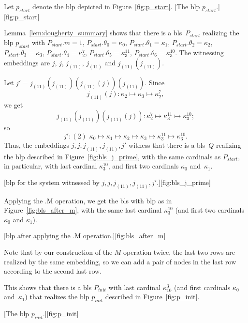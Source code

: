 \documentclass{article}
\theoremstyle{definition}
\theoremstyle{remark}
\begin{document}
Let $p_{start}$ denote the blp depicted in Figure~\ref{fig:p_start}. 
    [The blp $p_{start}$.][fig:p_start]

Lemma~\ref{lem:dougherty_summary} shows that there is a bls~$P_{start}$ realizing the blp $p_{start}$ with $P_{start}.m=1$, $P_{start}.\theta_0 = \kappa_0$, $P_{start}.\theta_1 = \kappa_1$, $P_{start}.\theta_2 = \kappa_2$, $P_{start}.\theta_3 = \kappa_3$, $P_{start}.\theta_4 = \kappa_2^7$, $P_{start}.\theta_5 = \kappa_3^{11}$, $P_{start}.\theta_6 = \kappa_3^{10}$. The witnessing embeddings are $j$, $j$, $j_{(11)}$, $j_{(11)}$ and $j_{(11)}(j_{(11)})$. 

Let $j'=j_{(11)}(j_{(11)})(j_{(11)}(j))(j_{(11)})$. Since
 \[j_{(11)}(j):\kappa_2\mapsto\kappa_3\mapsto\kappa_2^7,\] we get
  \[j_{(11)}(j_{(11)})(j_{(11)}(j)):\kappa_2^7\mapsto\kappa_3^{11}\mapsto\kappa_3^{10};\]  so 
  \[
    j'\colon (2) \,\, \kappa_0 \mapsto \kappa_1\mapsto \kappa_2 \mapsto \kappa_3 \mapsto \kappa_3^{11} \mapsto \kappa_3^{10}. 
  \]
  Thus, the embeddings $j,j,j_{(11)},j_{(11)},j'$ witness that there is a bls~$Q$ realizing the blp described in Figure~\ref{fig:bls_j_prime}, with the same cardinals as $P_{start}$, in particular, with last cardinal $\kappa_3^{10}$, and first two cardinals $\kappa_0$ and~$\kappa_1$.  

[blp for the system witnessed by $j,j,j_{(11)},j_{(11)},j'$.][fig:bls_j_prime]

Applying the .M operation, we get the bls with blp as in Figure~\ref{fig:bls_after_m}, with the same last cardinal $\kappa_3^{10}$ (and first two cardinals $\kappa_0$ and $\kappa_1$). 

[blp after applying the .M operation.][fig:bls_after_m]

Note that by our construction of the $M$ operation twice, the last two rows are realized by the same embedding, so we can add a pair of nodes in the last row according to the second last row.

This shows that there is a bls $P_{init}$ with last cardinal $\kappa^3_{10}$ (and first cardinals $\kappa_0$ and~$\kappa_1$) that realizes the blp $p_{init}$ described in Figure~\ref{fig:p_init}. 

[The blp $p_{init}$.][fig:p_init]
\end{document}
